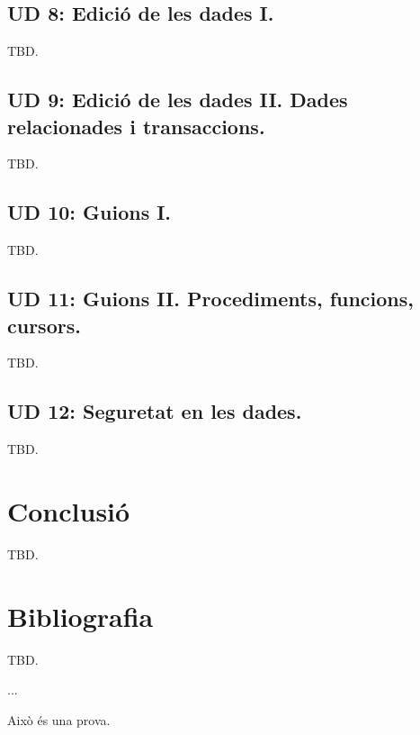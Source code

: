 \documentclass[catalan, a4paper, 12pt, titlepage]{article}
\begin{document}
  \subsection{UD 8: Edició de les dades I.}
  TBD.

  \subsection{UD 9: Edició de les dades II. Dades relacionades i transaccions.}
  TBD.

  \subsection{UD 10: Guions I.}
  TBD.

  \subsection{UD 11: Guions II. Procediments, funcions, cursors.}
  TBD.

  \subsection{UD 12: Seguretat en les dades.}
  TBD.

\section{Conclusió}
TBD.

\section{Bibliografia}
TBD.

...

Això és una prova.
\end{document}
